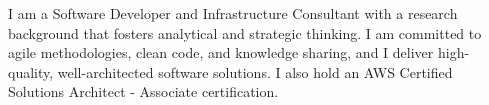\documentclass[9pt]{developercv} %
\begin{document}
	\begin{minipage}[t]{0.4\textwidth}
	    \vspace{-\baselineskip} %

	I am a Software Developer and Infrastructure Consultant with a research background that fosters analytical and strategic thinking. I am committed to agile methodologies, clean code, and knowledge sharing, and I deliver high-quality, well-architected software solutions. I also hold an AWS Certified Solutions Architect - Associate certification.
	\end{minipage}
	\hfill
	\begin{minipage}[t]{0.5\textwidth}
		\vspace{-\baselineskip} %

		\begin{barchart}{5.5}
		\end{barchart}
	\end{minipage}
	

	
\end{document}
